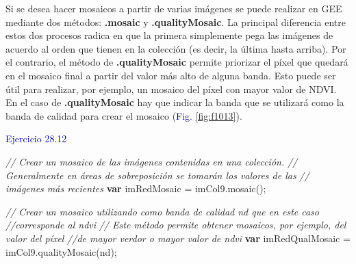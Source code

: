 \documentclass[
  12pt,
  letterpaper,
  twoside]{book}
\newenvironment{Shaded}{\begin{snugshade}}{\end{snugshade}}
\newcommand{\CommentTok}[1]{\textcolor[rgb]{0.24,0.58,0.00}{\textit{#1}}}
\newcommand{\FunctionTok}[1]{\textcolor[rgb]{0.48,0.12,0.64}{#1}}
\newcommand{\KeywordTok}[1]{\textcolor[rgb]{0.00,0.00,0.00}{\textbf{#1}}}
\newcommand{\NormalTok}[1]{#1}
\newcommand{\OperatorTok}[1]{\textcolor[rgb]{0.00,0.00,0.00}{#1}}
\newcommand{\StringTok}[1]{\textcolor[rgb]{0.87,0.29,0.22}{#1}}
\newcommand\boldpurple[1]{\textcolor{darkpurple}{\textbf{#1}}}
\begin{document}
Si se desea hacer mosaicos a partir de varias imágenes se puede realizar en GEE mediante dos métodos: \boldpurple{.mosaic} y \boldpurple{.qualityMosaic}. La principal diferencia entre estos dos procesos radica en que la primera simplemente pega las imágenes de acuerdo al orden que tienen en la colección (es decir, la última hasta arriba). Por el contrario, el método de \boldpurple{.qualityMosaic} permite priorizar el píxel que quedará en el mosaico final a partir del valor más alto de alguna banda. Esto puede ser útil para realizar, por ejemplo, un mosaico del píxel con mayor valor de NDVI. En el caso de \boldpurple{.qualityMosaic} hay que indicar la banda que se utilizará como la banda de calidad para crear el mosaico (\textcolor{darkblue}{Fig.} \ref{fig:f1013}).

\textcolor{darkblue}{Ejercicio 28.12}

\begin{Shaded}
\begin{Highlighting}[]
\CommentTok{// Crear un mosaico de las imágenes contenidas en una colección. }
\CommentTok{// Generalmente en áreas de sobreposición se tomarán los valores de las }
\CommentTok{// imágenes más recientes}
\KeywordTok{var}\NormalTok{ imRedMosaic }\OperatorTok{=}\NormalTok{ imCol9}\OperatorTok{.}\FunctionTok{mosaic}\NormalTok{()}\OperatorTok{;}

\CommentTok{// Crear un mosaico utilizando como banda de calidad \textquotesingle{}nd\textquotesingle{} que en este caso}
\CommentTok{//corresponde al ndvi}
\CommentTok{// Este método permite obtener mosaicos, por ejemplo, del valor del píxel}
\CommentTok{//de mayor verdor o mayor valor de ndvi}
\KeywordTok{var}\NormalTok{ imRedQualMosaic }\OperatorTok{=}\NormalTok{ imCol9}\OperatorTok{.}\FunctionTok{qualityMosaic}\NormalTok{(}\StringTok{\textquotesingle{}nd\textquotesingle{}}\NormalTok{)}\OperatorTok{;}
\end{Highlighting}
\end{Shaded}
\end{document}
